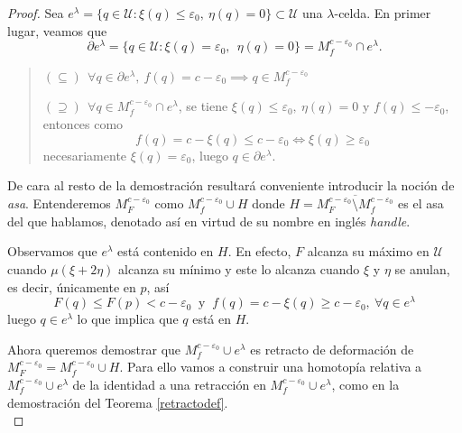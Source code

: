 \begin{proof}

    Sea $e^{\lambda}=\{q\in \mathcal{U}: \xi(q)\le \varepsilon_0,~\eta(q)=0 \}\subset \mathcal{U}$ una $\lambda$-celda. En primer lugar, veamos que
    \begin{equation*}
        \partial e^{\lambda}=\{q\in \mathcal{U}: \xi(q)= \varepsilon_0,~~\eta(q)=0 \}=M^{c-\varepsilon_0}_f\cap e^{\lambda}.
    \end{equation*}

    \begin{quote}
    $\left( \subseteq \right) ~~\forall q\in \partial e^{\lambda},~f(q)=c-\varepsilon_0 \implies q\in M^{c-\varepsilon_0}_f$
    
    $\left( \supseteq \right) ~~\forall q\in M^{c-\varepsilon_0}_f\cap e^{\lambda}$, se tiene $\xi(q)\le\varepsilon_0,~\eta(q)=0 \text{ y } f(q)\le -\varepsilon_0$, entonces como
    \begin{equation*}
        f(q)=c-\xi(q)\le c-\varepsilon_0\iff \xi(q)\ge \varepsilon_0
    \end{equation*}
    \quad \quad necesariamente $\xi(q)=\varepsilon_0$, luego $q\in \partial e^{\lambda}$. 
    \end{quote}
    \bigskip

    De cara al resto de la demostración resultará conveniente introducir la noción de \textit{asa}. Entenderemos $M_F^{c-\varepsilon_0}$ como $M_f^{c-\varepsilon_0}\cup H$ donde $H=\overline{M_F^{c-\varepsilon_0}\setminus M_f^{c-\varepsilon_0}}$ es el asa del que hablamos, denotado así en virtud de su nombre en inglés \textit{handle}.

    \medskip
    
    Observamos que $e^{\lambda}$ está contenido en $H$. En efecto, $F$ alcanza su máximo en $\mathcal{U}$ cuando $\mu(\xi+2\eta)$ alcanza su mínimo y este lo alcanza cuando $\xi$ y $\eta$ se anulan, es decir, únicamente en $p$, así
    \begin{equation*}
        F(q)\le F(p)<c-\varepsilon_0 ~\text{ y }~f(q)=c-\xi(q)\ge c-\varepsilon_0,~\forall q\in e^{\lambda}
    \end{equation*}
    luego $q\in e^{\lambda}$ lo que implica que $q$ está en $H$.

    \medskip

    
    Ahora queremos demostrar que $M^{c-\varepsilon_0}_f\cup e^{\lambda}$ es retracto de deformación de $M^{c-\varepsilon_0}_F = M_f^{c-\varepsilon_0}\cup H$. Para ello vamos a construir una homotopía relativa a $M^{c-\varepsilon_0}_f\cup e^{\lambda}$ de la identidad a una retracción en $M^{c-\varepsilon_0}_f\cup e^{\lambda}$, como en la demostración del Teorema \ref{retractodef}.\\


\end{proof}
